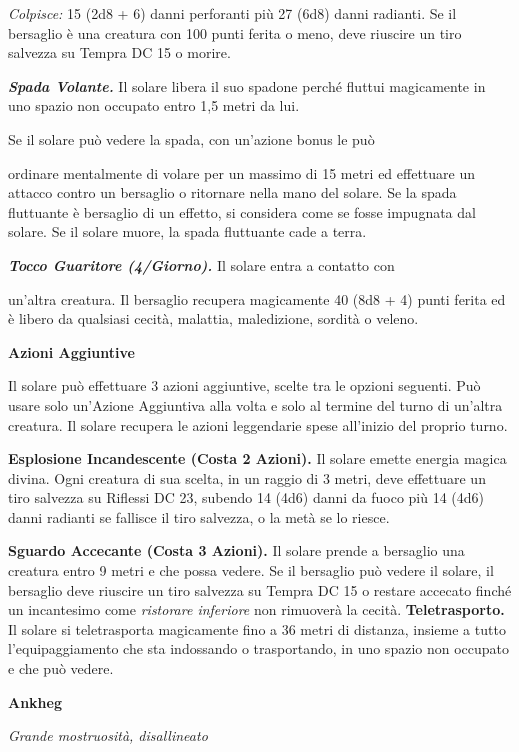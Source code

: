 \begin{multicols}{2}
\emph{Colpisce:} 15 (2d8 + 6) danni perforanti più 27 (6d8) danni
radianti. Se il bersaglio è una creatura con 100 punti ferita o meno,
deve riuscire un tiro salvezza su Tempra DC 15 o morire.

\emph{\textbf{Spada Volante.}} Il solare libera il suo spadone perché
fluttui magicamente in uno spazio non occupato entro 1,5 metri da lui.

Se il solare può vedere la spada, con un'azione bonus le può

ordinare mentalmente di volare per un massimo di 15 metri ed effettuare
un attacco contro un bersaglio o ritornare nella mano del solare. Se la
spada fluttuante è bersaglio di un effetto, si considera come se fosse
impugnata dal solare. Se il solare muore, la spada fluttuante cade a
terra.

\emph{\textbf{Tocco Guaritore (4/Giorno).}} Il solare entra a contatto
con

un'altra creatura. Il bersaglio recupera magicamente 40 (8d8 + 4) punti
ferita ed è libero da qualsiasi cecità, malattia, maledizione, sordità o
veleno.

\textbf{Azioni Aggiuntive}

Il solare può effettuare 3 azioni aggiuntive, scelte tra le opzioni
seguenti. Può usare solo un'Azione Aggiuntiva alla volta e solo al
termine del turno di un'altra creatura. Il solare recupera le azioni
leggendarie spese all'inizio del proprio turno.

\textbf{Esplosione Incandescente (Costa 2 Azioni).} Il solare emette
energia magica divina. Ogni creatura di sua scelta, in un raggio di 3
metri, deve effettuare un tiro salvezza su Riflessi DC 23, subendo 14
(4d6) danni da fuoco più 14 (4d6) danni radianti se fallisce il tiro
salvezza, o la metà se lo riesce.

\textbf{Sguardo Accecante (Costa 3 Azioni).} Il solare prende a
bersaglio una creatura entro 9 metri e che possa vedere. Se il bersaglio
può vedere il solare, il bersaglio deve riuscire un tiro salvezza su Tempra DC 15 o restare accecato finché un incantesimo come
\emph{ristorare inferiore} non rimuoverà la cecità.
\textbf{Teletrasporto.} Il solare si teletrasporta magicamente fino a 36
metri di distanza, insieme a tutto l'equipaggiamento che sta indossando
o trasportando, in uno spazio non occupato e che può vedere.



\textbf{Ankheg}

\emph{Grande mostruosità, disallineato}


\end{multicols}
